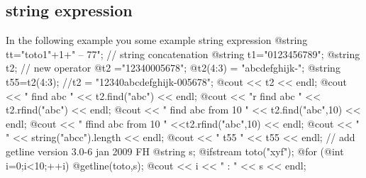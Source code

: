 \documentclass[a4paper,twoside,12pt]{book}
\begin{document}
\subsection{string expression}
In the following example you some example string expression 
\bFF
@string tt="toto1"+1+" -- 77"; // string concatenation   
@string t1="0123456789";
@string t2;
// new operator
@t2 ="12340005678";
@t2(4:3) = "abcdefghijk-"; 
@string t55=t2(4:3);
//t2 = "12340abcdefghijk-005678";
@cout << t2 << endl;
@cout << "  find abc " << t2.find("abc") << endl;
@cout << "r find abc " << t2.rfind("abc") << endl;
@cout << " find abc from 10  " << t2.find("abc",10) << endl;
@cout << " ffind abc from 10 " <<t2.rfind("abc",10) << endl;
@cout << "   " << string("abcc").length << endl; 
@cout << " t55 " << t55 << endl;
{  // add getline version 3.0-6 jan 2009 FH
@string s;
@ifstream toto("xyf");
@for (@int i=0;i<10;++i)
  {
   @getline(toto,s);
   @cout << i << " : " << s << endl;
  }
}
\eFF
\end{document}
